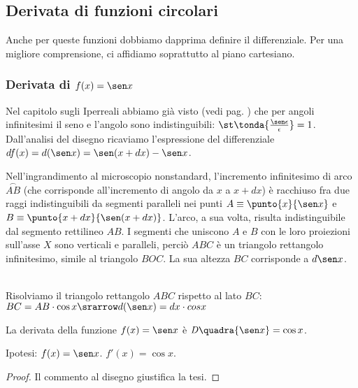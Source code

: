 \subsection{Derivata di funzioni circolari}
\label{}
Anche per queste funzioni dobbiamo dapprima definire il differenziale. 
Per una migliore comprensione, ci affidiamo soprattutto al piano cartesiano.
\subsubsection{Derivata di $f(x)=\sen x$}
Nel capitolo sugli Iperreali abbiamo già visto 
(vedi pag. \pageref{subsubsec:insnum_fseno}) che per angoli infinitesimi il seno e 
l'angolo sono indistinguibili: $\st\tonda{\frac{\sen \epsilon}{\epsilon}}=1$.
Dall'analisi del disegno ricaviamo l'espressione del differenziale
$df(x)=d(\sen x)= \sen (x+dx) -\sen x$.

\begin{inaccessibleblock}
  \begin{minipage}[]{.40\textwidth}
   \dseno 
 \end{minipage} 
  \hfill
 \begin{minipage}[]{.56\textwidth}
Nell'ingrandimento al microscopio nonstandard, l'incremento infinitesimo di
arco $\overset{\frown}{AB}$ (che corrisponde all'incremento di angolo da $x$
a $x+dx$) è racchiuso fra due raggi indistinguibili da segmenti paralleli nei
punti $A\equiv \punto{x}{\sen x}$ e $B\equiv \punto{x+dx}{\sen(x+dx)}$. 
L'arco, a sua volta, risulta indistinguibile dal segmento rettilineo $AB$.
I segmenti che uniscono $A$ e $B$ con le loro proiezioni sull'asse $X$ sono
verticali e paralleli, perciò $ABC$ è un triangolo rettangolo infinitesimo, 
simile al triangolo $BOC$. La sua altezza $BC$ corrisponde a $d\sen x$. 
 \end{minipage}
\end{inaccessibleblock}
\label{fig_diff01dseno}\\

Risolviamo il triangolo rettangolo $ABC$ rispetto al lato $BC$:\\
$BC=AB\cdot \cos x \srarrow d(\sen x)= dx\cdot cos x$  

\begin{teorema}
  La derivata della funzione $f(x)=\sen x$ è $\mathit{D}\quadra{\sen x}=\cos x$.
\end{teorema}
\noindent Ipotesi: $f(x)=\sen x$. \tab $f'(x)=\cos x$.
\begin{proof}
 Il commento al disegno giustifica la tesi. 
\end{proof}


